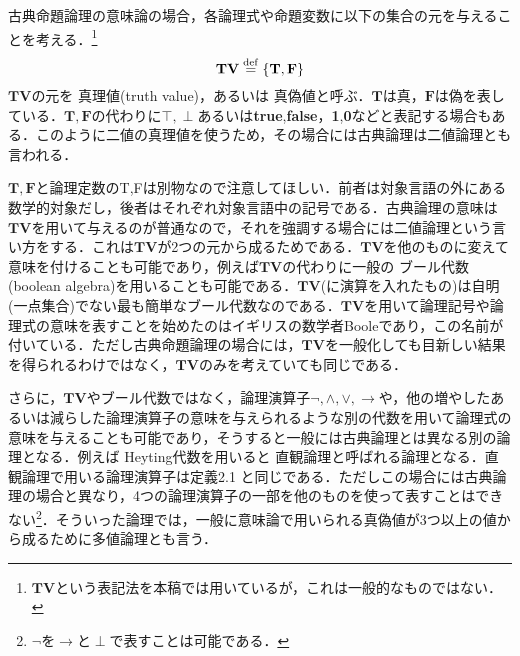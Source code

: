 \documentclass{ltjsarticle}
\theoremstyle{mystyle1}
\theoremstyle{mystyle2}
\newcommand{\bT}{\ensuremath{\mathbf{T}}}
\newcommand{\bF}{\ensuremath{\mathbf{F}}}
\newcommand{\bV}{\ensuremath{\mathbf{V}}}
\newcommand{\dequal}{\ensuremath{\stackrel{\rm{def}}{=}}}
\newcommand{\red}[1]{{\color{red} #1}}
\begin{document}
古典命題論理の意味論の場合，各論理式や命題変数に以下の集合の元を与えることを考える．\footnote{$\bT\bV$という表記法を本稿では用いているが，これは一般的なものではない．}
\[\bT\bV\dequal\{\bT,\bF\}\]
$\bT\bV$の元を\red{真理値}(truth value)，あるいは\red{真偽値}と呼ぶ．$\bT$は真，$\bF$は偽を表している．$\bT,\bF$の代わりに$\top,\perp$あるいは\textbf{true},\textbf{false}，\textbf{1},\textbf{0}などと表記する場合もある．このように二値の真理値を使うため，その場合には古典論理は二値論理とも言われる．

$\bT,\bF$と論理定数のT,Fは別物なので注意してほしい．前者は対象言語の外にある数学的対象だし，後者はそれぞれ対象言語中の記号である．古典論理の意味は$\bT\bV$を用いて与えるのが普通なので，それを強調する場合には二値論理という言い方をする．これは$\bT\bV$が2つの元から成るためである．$\bT\bV$を他のものに変えて意味を付けることも可能であり，例えば$\bT\bV$の代わりに一般の\red{ブール代数}(boolean algebra)を用いることも可能である．$\bT\bV$(に演算を入れたもの)は自明(一点集合)でない最も簡単なブール代数なのである．$\bT\bV$を用いて論理記号や論理式の意味を表すことを始めたのはイギリスの数学者Booleであり，この名前が付いている．ただし古典命題論理の場合には，$\bT\bV$を一般化しても目新しい結果を得られるわけではなく，$\bT\bV$のみを考えていても同じである．

さらに，$\bT\bV$やブール代数ではなく，論理演算子$\neg,\wedge,\vee,\to$や，他の増やしたあるいは減らした論理演算子の意味を与えられるような別の代数を用いて論理式の意味を与えることも可能であり，そうすると一般には古典論理とは異なる別の論理となる．例えば\red{Heyting代数}を用いると\red{直観論理}と呼ばれる論理となる．直観論理で用いる論理演算子は定義2.1 と同じである．ただしこの場合には古典論理の場合と異なり，4つの論理演算子の一部を他のものを使って表すことはできない\footnote{$\neg$を$\to$と$\perp$で表すことは可能である．}．そういった論理では，一般に意味論で用いられる真偽値が3つ以上の値から成るために多値論理とも言う．
\end{document}
